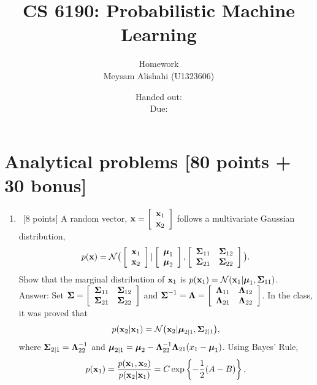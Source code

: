 \documentclass[12pt, fullpage,letterpaper]{article}
\title{CS 6190: Probabilistic Machine Learning \semester}
\author{Homework \assignmentId\\
{\red Meysam Alishahi (U1323606)}}
\date{Handed out: \releaseDate\\
  Due: \dueDate}
\def\red{\color{red}}
\def\blackblue{\color{black!40!blue}}
\begin{document}
\maketitle


\footnotesize

\section*{Analytical problems [80 points + 30 bonus]}	
\label{sec:q1}

\begin{enumerate}
\item~[8 points] A random vector, ${\bf x} = \left[\begin{array}{c}{\bf x}_1 \\  {\bf x}_2\end{array}\right]$ follows a multivariate Gaussian distribution, 
\[
p({\bf x}) = \mathcal{N}\big( \left[\begin{array}{c}{\bf x}_1 \\  {\bf x}_2\end{array}\right] |  \left[\begin{array}{c}\boldsymbol{\mu}_1 \\  \boldsymbol{\mu}_2\end{array}\right], \left[\begin{array}{cc} \boldsymbol{\Sigma}_{11} & \boldsymbol{\Sigma}_{12} \\  \boldsymbol{\Sigma}_{21} & \boldsymbol{\Sigma}_{22}\end{array}\right]\big).
\]
Show that the marginal distribution of ${\bf x}_1$ is $p({\bf x}_1) = \mathcal{N}({\bf x}_1| \boldsymbol{\mu}_1, \boldsymbol{\Sigma}_{11})$.\\
{\red Answer: }{\blackblue 
Set $\boldsymbol{\Sigma} = \left[\begin{array}{cc} \boldsymbol{\Sigma}_{11} & \boldsymbol{\Sigma}_{12} \\  \boldsymbol{\Sigma}_{21} & \boldsymbol{\Sigma}_{22}\end{array}\right]$ and 
$\boldsymbol{\Sigma}^{-1} = \mathbf{\Lambda} = \left[\begin{array}{cc} \mathbf{\Lambda}_{11} & \mathbf{\Lambda}_{12} \\  \mathbf{\Lambda}_{21} & \mathbf{\Lambda}_{22}\end{array}\right]$. 
  In the class, it was proved that 
$$p({\bf x}_2|{\bf x}_1) = \mathcal{N}\big({\bf x}_2|\boldsymbol{\mu}_{2|1},\boldsymbol{\Sigma}_{2|1}\big),$$
where $\boldsymbol{\Sigma}_{2|1} = \mathbf{\Lambda}^{-1}_{22}$ and $\boldsymbol{\mu}_{2|1}=\boldsymbol{\mu}_2 - \mathbf{\Lambda}_{22}^{-1}\mathbf{\Lambda}_{21}(x_1-\boldsymbol{\mu}_1)$.
Using Bayes' Rule,  
\begin{equation}\label{CQ1}
p({\bf x}_1) = \frac{p({\bf x}_1,{\bf x}_2)}{p({\bf x}_2|{\bf x}_1)}= C\exp\left\{-\frac12 (A-B)\right\},
\end{equation}
}
\end{enumerate}
\end{document}
